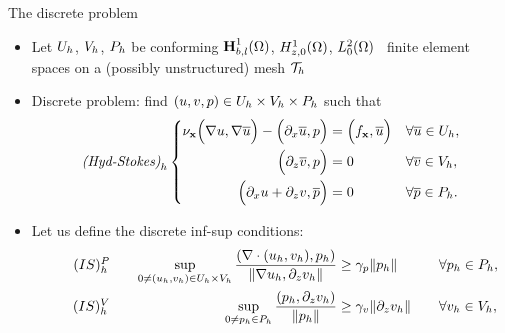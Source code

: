 \begin{frame}{The discrete problem}
  \begin{itemize}
  \item Let $U_h$, $V_h$, $P_h$
    be conforming $\textbf{H}_{b,l}^1(\Omega)$, $H_{z,0}^1(\Omega)$, $L_0^2(\Omega)$ \
    finite element spaces
    on a (possibly unstructured) mesh ${\cal T}_h$
  \item Discrete problem: find $(u,v,p) \in U_h\times V_h \times P_h$
    such that
\begin{equation*}
  \text{\emph{(Hyd-Stokes)}}_h
  \left\{
    \begin{aligned}
      \nu_{\mathbf{x}}\Big(\nabla u,\nabla \overline {u}\Big)
      -\Big(\partial_x\overline {u}, p\Big) &= \Big(f_{\mathbf{x}},\overline {u}\Big) && \forall
      \overline {u}\in U_h,
      \\
      \Big(\partial_z \overline {v}, p\Big) & =0 &&
      \forall\overline {v}\in V_h,
      \\
      \Big(\partial_x u + \partial_z v,\overline {p}\Big) & = 0 &&
      \forall\overline {p}\in P_h.
    \end{aligned}
  \right.
\end{equation*}

  \item Let us define the discrete inf-sup conditions:
\begin{alignat*}{4}
  \tag*{\ensuremath{(IS)^\PP_h}\xspace}
  \label{eq:ISph}
  &\quad&
  \sup_{0\neq(\uh,\vh)\in \Uh \times \Vh}
  \frac{(\div(\uh,\vh),\ph)}{\|\grad \uh,\dz \vh\|}
  &\ge \ConstISph \|\ph\|
  &\quad&
  \forall \ph \in \Ph,
  \\
  \tag*{\ensuremath{(IS)^\VV_h}\xspace}
  \label{eq:ISvh}
  &\quad &
  \sup_{0\neq \ph \in \Ph}
  \frac{(\ph,\dz \vh)}{\|\ph\|}
  &\ge \ConstISvh \|\dz\vh\|
  &\quad&
  \forall \vh\in \Vh,
\end{alignat*}
\end{itemize}
\end{frame}


